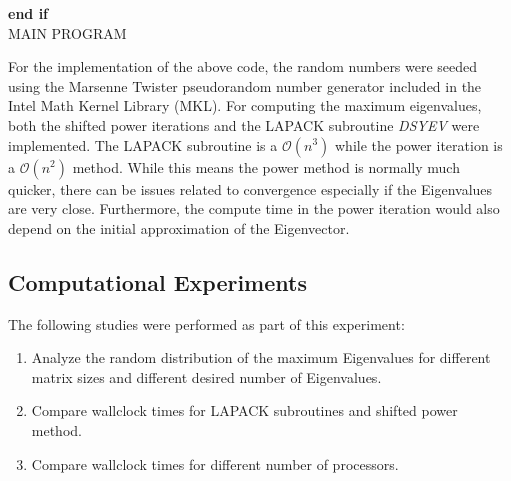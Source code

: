 \documentclass[11pt, oneside]{article}
\begin{document}
\begin{algorithm}
\textbf{end if} \\
\caption{MAIN PROGRAM}
\label{algomain}
\end{algorithm}

For the implementation of the above code, the random numbers were seeded using the Marsenne Twister pseudorandom number generator included in the Intel Math Kernel Library (MKL). For computing the maximum eigenvalues, both the shifted power iterations and the LAPACK subroutine \emph{DSYEV} were implemented. The LAPACK subroutine is a $\mathcal{O}(n^3)$ while the power iteration is a $\mathcal{O}(n^2)$ method. While this means the power method is normally much quicker, there can be issues related to convergence especially if the Eigenvalues are very close. Furthermore, the compute time in the power iteration would also depend on the initial approximation of the Eigenvector.

\subsection{Computational Experiments}
The following studies were performed as part of this experiment:
\begin{enumerate}
\item Analyze the random distribution of the maximum Eigenvalues for different matrix sizes and different desired number of Eigenvalues.
\item Compare wallclock times for LAPACK subroutines and shifted power method.
\item Compare wallclock times for different number of processors.
\end{enumerate}
\end{document}
